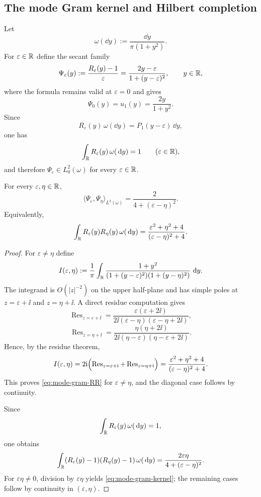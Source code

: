 \subsection{The mode Gram kernel and Hilbert completion}

Let
\[
\omega(\dd y):=\frac{\dd y}{\pi(1+y^2)}.
\]
For $\varepsilon\in\mathbb{R}$ define the secant family
\begin{equation}\label{eq:mode-secant-family}
\Psi_\varepsilon(y):=\frac{R_\varepsilon(y)-1}{\varepsilon}
=\frac{2y-\varepsilon}{1+(y-\varepsilon)^2},
\qquad y\in\mathbb{R},
\end{equation}
where the formula remains valid at $\varepsilon=0$ and gives
\[
\Psi_0(y)=u_1(y)=\frac{2y}{1+y^2}.
\]
Since
\[
R_\varepsilon(y)\,\omega(\dd y)=P_1(y-\varepsilon)\,\dd y,
\]
one has
\[
\int_{\mathbb{R}}R_\varepsilon(y)\,\omega(\,\mathrm{d} y)=1
\qquad(\varepsilon\in\mathbb{R}),
\]
and therefore $\Psi_\varepsilon\in L^2_0(\omega)$ for every
$\varepsilon\in\mathbb{R}$.

\begin{theorem}%
\label{thm:mode-gram-kernel}
For every $\varepsilon,\eta\in\mathbb{R}$,
\begin{equation}\label{eq:mode-gram-kernel}
\langle \Psi_\varepsilon,\Psi_\eta\rangle_{L^2(\omega)}
=\frac{2}{4+(\varepsilon-\eta)^2}.
\end{equation}
Equivalently,
\begin{equation}\label{eq:mode-gram-RR}
\int_{\mathbb{R}}R_\varepsilon(y)R_\eta(y)\,\omega(\,\mathrm{d} y)
=\frac{\varepsilon^2+\eta^2+4}{(\varepsilon-\eta)^2+4}.
\end{equation}
\end{theorem}

\begin{proof}
For $\varepsilon\neq\eta$ define
\[
I(\varepsilon,\eta)
:=\frac{1}{\pi}\int_{\mathbb{R}}
\frac{1+y^2}{(1+(y-\varepsilon)^2)(1+(y-\eta)^2)}\,\,\mathrm{d} y.
\]
The integrand is $O(|z|^{-2})$ on the upper half-plane and has simple
poles at $z=\varepsilon+\ii$ and $z=\eta+\ii$.  A direct residue
computation gives
\[
\operatorname{Res}_{z=\varepsilon+\ii}
=\frac{\varepsilon(\varepsilon+2\ii)}
{2\ii(\varepsilon-\eta)(\varepsilon-\eta+2\ii)},
\]
\[
\operatorname{Res}_{z=\eta+\ii}
=\frac{\eta(\eta+2\ii)}
{2\ii(\eta-\varepsilon)(\eta-\varepsilon+2\ii)}.
\]
Hence, by the residue theorem,
\[
I(\varepsilon,\eta)
=2\mathrm{i}\Bigl(
\operatorname{Res}_{z=\varepsilon+\mathrm{i}}
+\operatorname{Res}_{z=\eta+\mathrm{i}}
\Bigr)
=\frac{\varepsilon^2+\eta^2+4}{(\varepsilon-\eta)^2+4}.
\]
This proves \eqref{eq:mode-gram-RR} for $\varepsilon\neq\eta$, and the
diagonal case follows by continuity.

Since
\[
\int_{\mathbb{R}}R_\varepsilon(y)\,\omega(\,\mathrm{d} y)=1,
\]
one obtains
\[
\int_{\mathbb{R}}(R_\varepsilon(y)-1)(R_\eta(y)-1)\,\omega(\,\mathrm{d} y)
=\frac{2\varepsilon\eta}{4+(\varepsilon-\eta)^2}.
\]
For $\varepsilon\eta\neq 0$, division by $\varepsilon\eta$ yields
\eqref{eq:mode-gram-kernel}; the remaining cases follow by continuity in
$(\varepsilon,\eta)$.
\end{proof}

